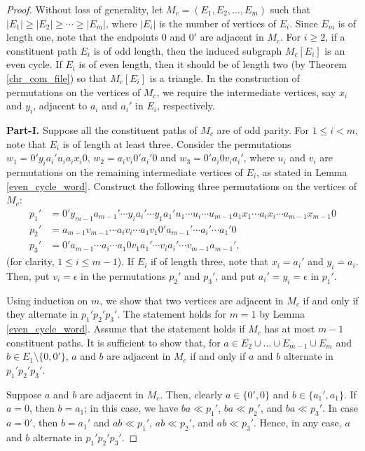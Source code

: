 \documentclass{llncs}
\begin{document}
\begin{proof}
	Without loss of generality, let $M_c = (E_1,E_2, \ldots, E_m)$ such that $|E_1| \ge |E_2|\ge \cdots \ge |E_m|$, where $|E_i|$ is the number of vertices of $E_i$.  Since $E_m$ is of length one, note that the endpoints $0$ and $0'$ are adjacent in $M_c$. For $i \ge 2$, if a constituent path $E_i$ is of odd length, then the induced subgraph $M_c[E_i]$ is an even cycle. If $E_i$ is of even length, then it should be of length two (by Theorem \ref{chr_com_file}) so that $M_c[E_i]$ is a triangle. In the construction of permutations on the vertices of $M_c$, we require the intermediate vertices, say $x_i$ and $y_i$, adjacent to $a_i$ and $a_i'$ in $E_i$, respectively. 
	
	\noindent\textbf{Part-I.} Suppose all the constituent paths of $M_c$ are of odd parity.
	For $1 \le i < m$, note that $E_i$ is of length at least three. Consider the permutations $w_1 = 0'y_ia_i' u_i a_i x_i 0$, $w_2 = a_i v_i 0' a_i' 0$ and $w_3 = 0' a_i 0 v_i a_i'$, where $u_i$ and $v_i$ are permutations on the remaining intermediate vertices of $E_i$, as stated in Lemma \ref{even_cycle_word}. 
	Construct the following three permutations on the vertices of $M_c$: 
	\begin{align*}
		p_1' &= 0' y_{m-1} a_{m-1}' \cdots y_i a_i' \cdots y_1 a_1' u_{1} \cdots u_i  \cdots  u_{m-1}    a_1 x_1 \cdots a_i x_i   \cdots  a_{m-1} x_{m-1} 0 \\
		p_2' &= a_{m-1}v_{m-1}        \cdots  a_iv_i \cdots a_1 v_1    0'  a_{m-1}'    \cdots a_{i}' \cdots a_1'0\\
		p_3' &= 0'a_{m-1} \cdots a_{i} \cdots a_1 0 v_{1}a_{1}' \cdots v_ia_i' \cdots      v_{m-1} a_{m-1}',
	\end{align*} (for clarity, $1 \le i \le m-1$).
	If $E_i$ if of length three, note that $x_i = a_i'$ and $y_i = a_i$. Then, put $v_i = \epsilon$ in the permutations $p_2'$ and $p_3'$, and put $a_i' = y_i = \epsilon$ in $p_1'$. 
	
	Using induction on $m$, we show that two vertices are adjacent in $M_c$ if and only if they alternate in $p_1'p_2'p_3'$. 
	The statement holds for $m = 1$ by Lemma \ref{even_cycle_word}. Assume that the statement holds if $M_c$ has at most $m - 1$ constituent paths. It is sufficient to show that, for $a \in  E_2 \cup \ldots \cup E_{m-1} \cup E_m$ and $b \in E_{1} \setminus \{0,0'\}$, $a$ and $b$ are adjacent in $M_c$ if and only if $a$ and $b$ alternate in $p_1'p_2'p_3'$.
	
	Suppose  $a$ and $b$ are adjacent in $M_c$. Then, clearly $a \in \{0',0\}$ and $b \in \{a_{1}', a_{1}\}$. If $a = 0$, then $b = a_{1}$; in this case, we have $ba \ll p_1'$, $ba \ll p_2'$, and $ba \ll  p_3'$. In case $a = 0'$, then $b = a_{1}'$ and $ab \ll p_1'$, $ab \ll p_2'$, and $ab \ll p_3'$. Hence, in any case, $a$ and $b$ alternate in $p_1'p_2'p_3'$.
	

\end{proof}
\end{document}
